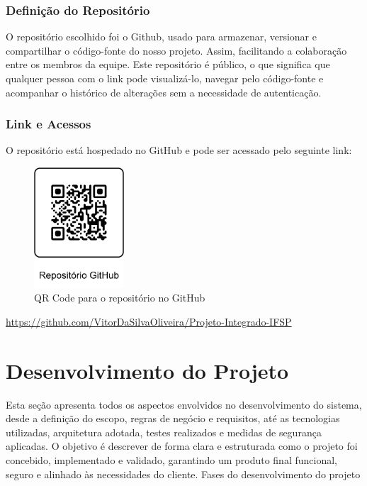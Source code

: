 \documentclass[
	12pt,				%
	openany,			%
	twoside,			%
	a4paper,			%
	english,			%
	brazil				%
	]{abntex2}
\begin{document}
\subsection{Definição do Repositório}

O repositório escolhido foi o Github, usado para armazenar, versionar e compartilhar o código-fonte do nosso projeto. Assim, facilitando a colaboração entre os membros da equipe. Este repositório é público, o que significa que qualquer pessoa com o link pode visualizá-lo, navegar pelo código-fonte e acompanhar o histórico de alterações sem a necessidade de autenticação.

\subsection{Link e Acessos}

O repositório está hospedado no GitHub e pode ser acessado pelo seguinte link:

\begin{figure}[h!]
    \centering
    \includegraphics[width=0.3\textwidth]{Figuras/QR-CODE-GitHub.png}
    \caption{QR Code para o repositório no GitHub}
    
\end{figure}
\begin{center}
    \href{https://github.com/VitorDaSilvaOliveira/Projeto-Integrado-IFSP}{https://github.com/VitorDaSilvaOliveira/Projeto-Integrado-IFSP}
\end{center}

\chapter{Desenvolvimento do Projeto}

Esta seção apresenta todos os aspectos envolvidos no desenvolvimento do sistema, desde a definição do escopo, regras de negócio e requisitos, até as tecnologias utilizadas, arquitetura adotada, testes realizados e medidas de segurança aplicadas. O objetivo é descrever de forma clara e estruturada como o projeto foi concebido, implementado e validado, garantindo um produto final funcional, seguro e alinhado às necessidades do cliente.
Fases do desenvolvimento do projeto
\end{document}
